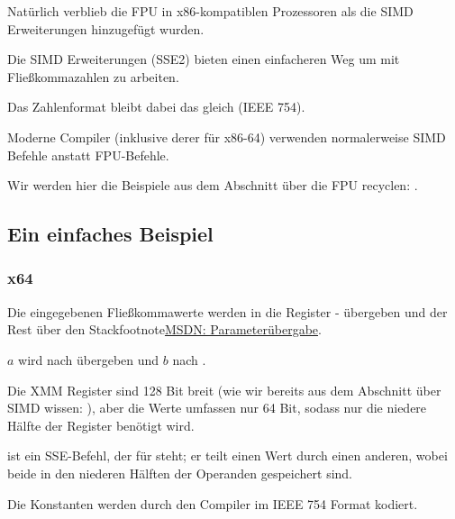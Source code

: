 
\label{floating_SIMD}
Natürlich verblieb die \ac{FPU} in x86-kompatiblen Prozessoren als die \ac{SIMD} Erweiterungen hinzugefügt wurden.

Die \ac{SIMD} Erweiterungen (SSE2) bieten einen einfacheren Weg um mit Fließkommazahlen zu arbeiten.

Das Zahlenformat bleibt dabei das gleich (IEEE 754).

Moderne Compiler (inklusive derer für x86-64) verwenden normalerweise \ac{SIMD} Befehle anstatt FPU-Befehle.

Wir werden hier die Beispiele aus dem Abschnitt über die FPU recyclen: .

\subsection{Ein einfaches Beispiel}



\subsubsection{x64}


Die eingegebenen Fließkommawerte werden in die Register - übergeben und der Rest über den
Stackfootnote{\href{http://msdn.microsoft.com/en-us/library/zthk2dkh.aspx}{MSDN: Parameterübergabe}}.

$a$ wird nach  übergeben und $b$ nach .

Die XMM Register sind 128 Bit breit (wie wir bereits aus dem Abschnitt über \ac{SIMD} wissen: ), aber
die \Tdouble Werte umfassen nur 64 Bit, sodass nur die niedere Hälfte der Register benötigt wird.

 ist ein SSE-Befehl, der für  
 steht;
er teilt einen \Tdouble Wert durch einen anderen, wobei beide in den niederen Hälften der Operanden gespeichert sind. 

Die Konstanten werden durch den Compiler im IEEE 754 Format kodiert.

